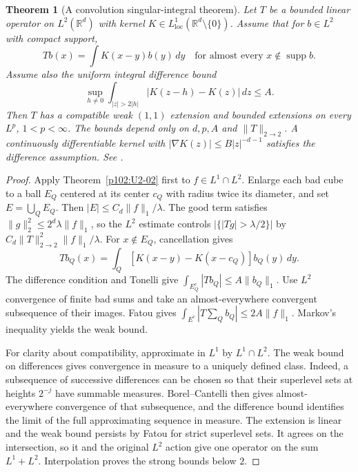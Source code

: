 \documentclass[11pt,oneside,openany]{book}
\newtheorem{theorem}{Theorem}[chapter]
\theoremstyle{definition}
\theoremstyle{remark}
\begin{document}
\begin{theorem}[A convolution singular-integral theorem]
\label{p102:U2-03}
Let \(T\) be a bounded linear operator on \(L^2(\mathbb R^d)\) with kernel \(K\in L^1_{\mathrm{loc}}(\mathbb R^d\setminus\{0\})\). Assume that for \(b\in L^2\) with compact support,
\[
 Tb(x)=\int K(x-y)b(y)\,dy\quad\text{for almost every }x\notin\operatorname{supp} b.
\]
Assume also the uniform integral difference bound
\[
 \sup_{h\ne0}\int_{|z|>2|h|}|K(z-h)-K(z)|\,dz\le A .
\]
Then \(T\) has a compatible weak \((1,1)\) extension and bounded extensions on every \(L^p\), \(1<p<\infty\). The bounds depend only on \(d,p,A\) and \(\|T\|_{2\to2}\). A continuously differentiable kernel with \(|\nabla K(z)|\le B|z|^{-d-1}\) satisfies the difference assumption. See \cite[\S5.3.2]{grafakos}.
\end{theorem}
\begin{proof}
Apply Theorem~\ref{p102:U2-02} first to \(f\in L^1\cap L^2\). Enlarge each bad cube to a ball \(E_Q\) centered at its center \(c_Q\) with radius twice its diameter, and set \(E=\bigcup_Q E_Q\). Then \(|E|\le C_d\|f\|_1/\lambda\). The good term satisfies \(\|g\|_2^2\le2^d\lambda\|f\|_1\), so the \(L^2\) estimate controls \(|\{|Tg|>\lambda/2\}|\) by \(C_d\|T\|_{2\to2}^2\|f\|_1/\lambda\). For \(x\notin E_Q\), cancellation gives
\[
 Tb_Q(x)=\int_Q [K(x-y)-K(x-c_Q)]b_Q(y)\,dy.
\]
The difference condition and Tonelli give \(\int_{E_Q^c}|Tb_Q|\le A\|b_Q\|_1\). Use \(L^2\) convergence of finite bad sums and take an almost-everywhere convergent subsequence of their images. Fatou gives
\(\int_{E^c}|T\sum_Q b_Q|\le2A\|f\|_1\). Markov's inequality yields the weak bound.

For clarity about compatibility, approximate in \(L^1\) by \(L^1\cap L^2\). The weak bound on differences gives convergence in measure to a uniquely defined class. Indeed, a subsequence of successive differences can be chosen so that their superlevel sets at heights \(2^{-j}\) have summable measures. Borel--Cantelli then gives almost-everywhere convergence of that subsequence, and the difference bound identifies the limit of the full approximating sequence in measure. The extension is linear and the weak bound persists by Fatou for strict superlevel sets. It agrees on the intersection, so it and the original \(L^2\) action give one operator on the sum \(L^1+L^2\). Interpolation proves the strong bounds below \(2\).


\end{proof}
\end{document}
